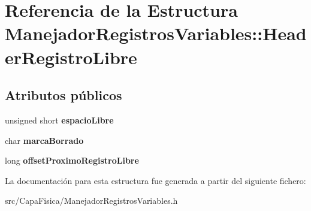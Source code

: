 \hypertarget{struct_manejador_registros_variables_1_1_header_registro_libre}{\section{\-Referencia de la \-Estructura \-Manejador\-Registros\-Variables\-:\-:\-Header\-Registro\-Libre}
\label{struct_manejador_registros_variables_1_1_header_registro_libre}
}
\subsection*{\-Atributos públicos}
\begin{DoxyCompactItemize}
\item 
\hypertarget{struct_manejador_registros_variables_1_1_header_registro_libre_aa7f4ecbcbc98a40b566eed135e0c383e}{unsigned short {\bfseries espacio\-Libre}}\label{struct_manejador_registros_variables_1_1_header_registro_libre_aa7f4ecbcbc98a40b566eed135e0c383e}

\item 
\hypertarget{struct_manejador_registros_variables_1_1_header_registro_libre_a277d80edbef9aec28dea9deedce7b57a}{char {\bfseries marca\-Borrado}}\label{struct_manejador_registros_variables_1_1_header_registro_libre_a277d80edbef9aec28dea9deedce7b57a}

\item 
\hypertarget{struct_manejador_registros_variables_1_1_header_registro_libre_ad0896d3cabac8ecf2f9a0f7472cc872e}{long {\bfseries offset\-Proximo\-Registro\-Libre}}\label{struct_manejador_registros_variables_1_1_header_registro_libre_ad0896d3cabac8ecf2f9a0f7472cc872e}

\end{DoxyCompactItemize}


\-La documentación para esta estructura fue generada a partir del siguiente fichero\-:\begin{DoxyCompactItemize}
\item 
src/\-Capa\-Fisica/\-Manejador\-Registros\-Variables.\-h\end{DoxyCompactItemize}
